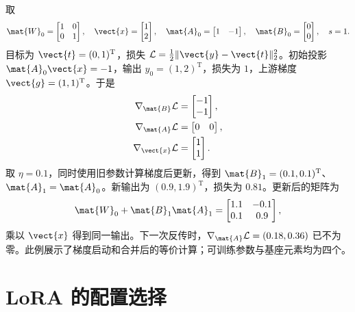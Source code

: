 \documentclass[../textbook.tex]{subfiles}
\begin{document}
\begin{example}


取
\begin{equation*}
\mat{W}_0=\begin{bmatrix}1&0\\0&1\end{bmatrix},\quad
\vect{x}=\begin{bmatrix}1\\2\end{bmatrix},\quad
\mat{A}_0=\begin{bmatrix}1&-1\end{bmatrix},\quad
\mat{B}_0=\begin{bmatrix}0\\0\end{bmatrix},\quad s=1.
\end{equation*}
目标为 $\vect{t}=(0,1)^{\mathrm{T}}$，损失 $\mathcal L=\frac{1}{2}\|\vect{y}-\vect{t}\|_2^2$。初始投影 $\mat{A}_0\vect{x}=-1$，输出 $y_0=(1,2)^{\mathrm{T}}$，损失为 $1$，上游梯度 $\vect{g}=(1,1)^{\mathrm{T}}$。于是
\begin{align*}
\nabla_{\mat{B}}\mathcal L &= \begin{bmatrix}-1\\-1\end{bmatrix}, \\
\nabla_{\mat{A}}\mathcal L &= \begin{bmatrix}0&0\end{bmatrix}, \\
\nabla_{\vect{x}}\mathcal L &= \begin{bmatrix}1\\1\end{bmatrix}.
\end{align*}
取 $\eta=0.1$，同时使用旧参数计算梯度后更新，得到 $\mat{B}_1=(0.1,0.1)^{\mathrm{T}}$、$\mat{A}_1=\mat{A}_0$。新输出为 $(0.9,1.9)^{\mathrm{T}}$，损失为 $0.81$。更新后的矩阵为
\begin{equation*}
\mat{W}_0+\mat{B}_1\mat{A}_1=
\begin{bmatrix}1.1&-0.1\\0.1&0.9\end{bmatrix},
\end{equation*}
乘以 $\vect{x}$ 得到同一输出。下一次反传时，$\nabla_{\mat{A}}\mathcal L=(0.18,0.36)$ 已不为零。此例展示了梯度启动和合并后的等价计算；可训练参数与基座元素均为四个。
\end{example}

\section{LoRA 的配置选择}
\end{document}
